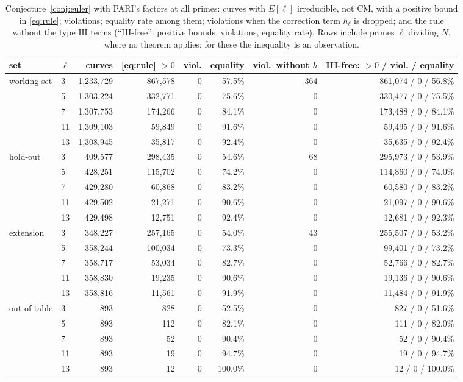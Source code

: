\documentclass[11pt]{amsart}
\theoremstyle{definition}
\begin{document}
\begin{table}[ht]\centering\footnotesize
{\footnotesize
\begin{tabular}{llrrrrrr}
\toprule
set & $\ell$ & curves & \eqref{eq:rule} $>0$ & viol. & equality & viol.\ without $h$ & III-free: $>0$ / viol. / equality\\
\midrule
working set & 3 & 1,233,729 & 867,578 & 0 & 57.5\% & 364 & 861,074 / 0 / 56.8\% \\
 & 5 & 1,303,224 & 332,771 & 0 & 75.6\% & 0 & 330,477 / 0 / 75.5\% \\
 & 7 & 1,307,753 & 174,266 & 0 & 84.1\% & 0 & 173,488 / 0 / 84.1\% \\
 & 11 & 1,309,103 & 59,849 & 0 & 91.6\% & 0 & 59,495 / 0 / 91.6\% \\
 & 13 & 1,308,945 & 35,817 & 0 & 92.4\% & 0 & 35,635 / 0 / 92.4\% \\
\midrule
hold-out & 3 & 409,577 & 298,435 & 0 & 54.6\% & 68 & 295,973 / 0 / 53.9\% \\
 & 5 & 428,251 & 115,702 & 0 & 74.2\% & 0 & 114,860 / 0 / 74.0\% \\
 & 7 & 429,280 & 60,868 & 0 & 83.2\% & 0 & 60,580 / 0 / 83.2\% \\
 & 11 & 429,502 & 21,271 & 0 & 90.6\% & 0 & 21,097 / 0 / 90.6\% \\
 & 13 & 429,498 & 12,751 & 0 & 92.4\% & 0 & 12,681 / 0 / 92.3\% \\
\midrule
extension & 3 & 348,227 & 257,165 & 0 & 54.0\% & 43 & 255,507 / 0 / 53.2\% \\
 & 5 & 358,244 & 100,034 & 0 & 73.3\% & 0 & 99,401 / 0 / 73.2\% \\
 & 7 & 358,717 & 53,034 & 0 & 82.7\% & 0 & 52,766 / 0 / 82.7\% \\
 & 11 & 358,830 & 19,235 & 0 & 90.6\% & 0 & 19,136 / 0 / 90.6\% \\
 & 13 & 358,816 & 11,561 & 0 & 91.9\% & 0 & 11,484 / 0 / 91.9\% \\
\midrule
out of table & 3 & 893 & 828 & 0 & 52.5\% & 0 & 827 / 0 / 51.6\% \\
 & 5 & 893 & 112 & 0 & 82.1\% & 0 & 111 / 0 / 82.0\% \\
 & 7 & 893 & 52 & 0 & 90.4\% & 0 & 52 / 0 / 90.4\% \\
 & 11 & 893 & 19 & 0 & 94.7\% & 0 & 19 / 0 / 94.7\% \\
 & 13 & 893 & 12 & 0 & 100.0\% & 0 & 12 / 0 / 100.0\% \\
\bottomrule
\end{tabular}
}
\caption{Conjecture~\ref{conj:euler} with PARI's factors at all primes: curves with $E[\ell]$ irreducible, not CM, with a positive bound in \eqref{eq:rule}; violations; equality rate among them; violations when the correction term $h_\ell$ is dropped; and the rule without the type $\mathrm{III}$ terms (``III-free'': positive bounds, violations, equality rate). Rows include primes $\ell$ dividing $N$, where no theorem applies; for these the inequality is an observation.}\label{tab:uniform}
\end{table}
\end{document}
